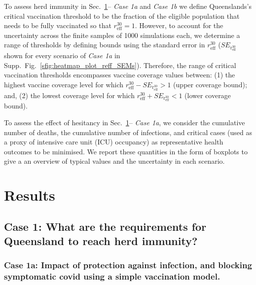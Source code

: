\documentclass[article, a4, authoryear]{elsarticle}
\begin{document}
To assess herd immunity in Sec.~\ref{sec:results}-- \textit{Case 1a} and \textit{Case 1b} we define Queenslands's critical vaccination threshold to be the fraction of the eligible population that needs to be fully vaccinated so that $r_\mathrm{eff}^{30}=1$. However, to account for the uncertainty across the finite samples of 1000 simulations each, we determine a range of thresholds by defining bounds using the standard error in $r_\mathrm{eff}^{30}$ ($SE_\mathrm{r_\mathrm{eff}^{30}}$ shown for every scenario of \textit{Case 1a} in Supp.~Fig.~\ref{sfig:heatmap_plot_reff_SEMs}). Therefore, the range of critical vaccination thresholds encompasses vaccine coverage values between: (1) the highest vaccine coverage level for which $r_\mathrm{eff}^{30} - SE_\mathrm{r_\mathrm{eff}^{30}} > 1$ (upper coverage bound); and, (2) the lowest coverage level for which $r_\mathrm{eff}^{30} + SE_\mathrm{r_\mathrm{eff}^{30}} < 1$ (lower coverage bound). 

To assess the effect of hesitancy in Sec.~\ref{sec:results}-- \textit{Case 1a}, we consider the cumulative number of deaths, the cumulative number of infections, and critical cases (used as a proxy of intensive care unit (ICU) occupancy) as representative health outcomes to be minimised. 
We report these quantities in the form of boxplots to give a an overview of typical values and  the uncertainty in each scenario.   


\section{Results}
\label{sec:results}

\subsection{Case 1: What are the requirements for Queensland to reach herd immunity?}
\label{subsec:case_i}
\subsubsection*{Case 1a: Impact of protection against infection, and blocking symptomatic covid using a simple vaccination model.}
\label{subsubsec:1a}
\end{document}
